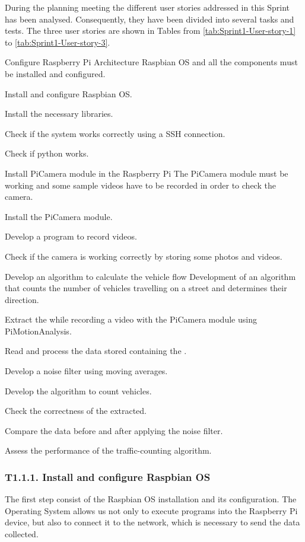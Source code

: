 During the planning meeting the different user stories addressed in this Sprint has been analysed. Consequently, they have been divided into several tasks and tests. The three user stories are shown in Tables from \ref{tab:Sprint1-User-story-1} to \ref{tab:Sprint1-User-story-3}.

{Configure Raspberry Pi Architecture}
{Raspbian \ac{OS} and all the components must be installed and configured.}
{	\item Install and configure Raspbian \ac{OS}.
	\item Install the necessary libraries.
}{	\item Check if the system works correctly using a SSH connection.
	\item Check if python works.
}

{Install PiCamera module in the Raspberry Pi}
{The PiCamera module must be working and some sample videos have to be recorded in order to check the camera.}
{	\item Install the PiCamera module.
	\item Develop a program to record videos.
}{	\item Check if the camera is working correctly by storing some photos and videos.
}

{Develop an algorithm to calculate the vehicle flow}
{Development of an algorithm that counts the number of vehicles travelling on a street and determines their direction.}
{	\item Extract the  while recording a video with the PiCamera module using PiMotionAnalysis.
	\item Read and process the data stored containing the .
	\item Develop a noise filter using moving averages.
	\item Develop the algorithm to count vehicles.
}{	\item Check the correctness of the  extracted.
	\item Compare the data before and after applying the noise filter.
	\item Assess the performance of the traffic-counting algorithm.
}

\subsubsection{T1.1.1. Install and configure Raspbian \ac{OS}}
The first step consist of the Raspbian \ac{OS} installation and its configuration. The Operating System allows us not only to execute programs into the Raspberry Pi device, but also to connect it to the network, which is necessary to send the data collected.

